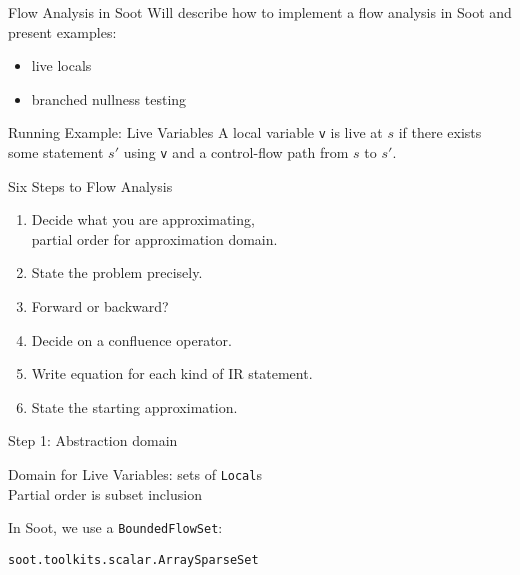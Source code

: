 \begin{slide}{Flow Analysis in Soot}
Will describe how to implement a flow analysis in Soot and present examples:
\begin{itemize}
\item live locals
\item branched nullness testing
\end{itemize}
\end{slide}

\begin{slide}{Running Example: Live Variables}
\vspace*{-0.2in} 
A local variable {\tt v} is {\red live} at $s$ if there exists some
statement $s'$ using {\tt v} and a control-flow path from $s$ to $s'$.

\quad

\begin{center}

\end{center}
\end{slide}

\begin{slide}{Six Steps to Flow Analysis}
\begin{enumerate}
\item Decide what you are approximating,\\ partial order for approximation domain.

\item State the problem precisely.

\item Forward or backward?

\item Decide on a confluence operator.

\item Write equation for each kind of IR statement.

\item State the starting approximation.
\end{enumerate}
\end{slide}

\begin{slide}{Step 1: Abstraction domain}
\vspace*{-0.2in}

Domain for Live Variables: sets of {\tt Local}s\\
Partial order is subset inclusion

\begin{center}
\scalebox{0.95}{
}
\mbox{\qquad }
\end{center}
\vspace*{-0.1in}

In Soot, we use a {\tt BoundedFlowSet}:
\begin{center}
{\tt soot.toolkits.scalar.ArraySparseSet} 
\end{center}
\end{slide}

